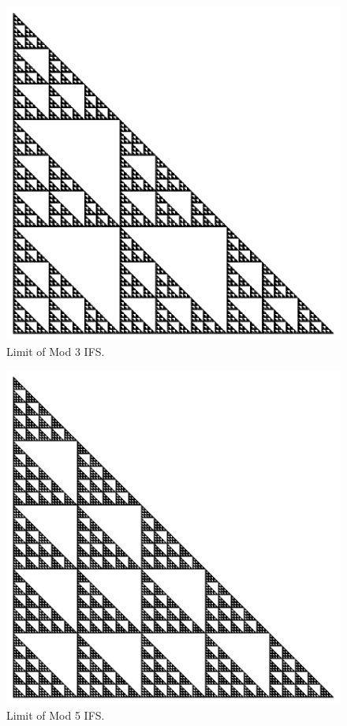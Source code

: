 \documentclass{beamer}
\begin{document}
\begin{frame}
    \begin{figure}
        \centering
        \includegraphics[scale=0.5]{GlobalMod3.pdf}
        \caption{Limit of Mod 3 IFS.}
    \end{figure}
\end{frame}

\begin{frame}
    \begin{figure}
        \centering
        \includegraphics[scale=0.5]{GlobalMod5}
        \caption{Limit of Mod 5 IFS.}
    \end{figure}
\end{frame}
\end{document}

